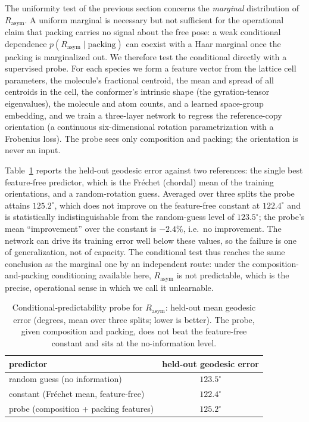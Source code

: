 \documentclass[10pt]{article}
\begin{document}
The uniformity test of the previous section concerns the \emph{marginal}
distribution of $R_{\text{asym}}$. A uniform marginal is necessary but not
sufficient for the operational claim that packing carries no signal about the
free pose: a weak conditional dependence
$p(R_{\text{asym}}\mid\text{packing})$ can coexist with a Haar marginal once the
packing is marginalized out. We therefore test the conditional directly with a
supervised probe. For each species we form a feature vector from the lattice cell
parameters, the molecule's fractional centroid, the mean and spread of all
centroids in the cell, the conformer's intrinsic shape (the gyration-tensor
eigenvalues), the molecule and atom counts, and a learned space-group embedding,
and we train a three-layer network to regress the reference-copy orientation
(a continuous six-dimensional rotation parametrization with a Frobenius loss).
The probe sees only composition and packing; the orientation is never an input.

Table~\ref{tab:probe} reports the held-out geodesic error against two references:
the single best feature-free predictor, which is the Fr\'echet (chordal) mean of
the training orientations, and a random-rotation guess. Averaged over three
splits the probe attains $125.2^\circ$, which does not improve on the
feature-free constant at $122.4^\circ$ and is statistically indistinguishable from
the random-guess level of $123.5^\circ$; the probe's mean ``improvement'' over the
constant is $-2.4\%$, i.e.\ no improvement. The network can drive its training
error well below these values, so the failure is one of generalization, not of
capacity. The conditional test thus reaches the same conclusion as the marginal
one by an independent route: under the composition-and-packing conditioning
available here, $R_{\text{asym}}$ is not predictable, which is the precise,
operational sense in which we call it unlearnable.

\begin{table}[h]
\centering
\caption{Conditional-predictability probe for $R_{\text{asym}}$: held-out mean
geodesic error (degrees, mean over three splits; lower is better). The probe,
given composition and packing, does not beat the feature-free constant and sits
at the no-information level.}
\label{tab:probe}
\begin{tabular}{lc}
\toprule
predictor & held-out geodesic error \\
\midrule
random guess (no information)        & $123.5^\circ$ \\
constant (Fr\'echet mean, feature-free) & $122.4^\circ$ \\
probe (composition + packing features)  & $125.2^\circ$ \\
\bottomrule
\end{tabular}
\end{table}
\end{document}
